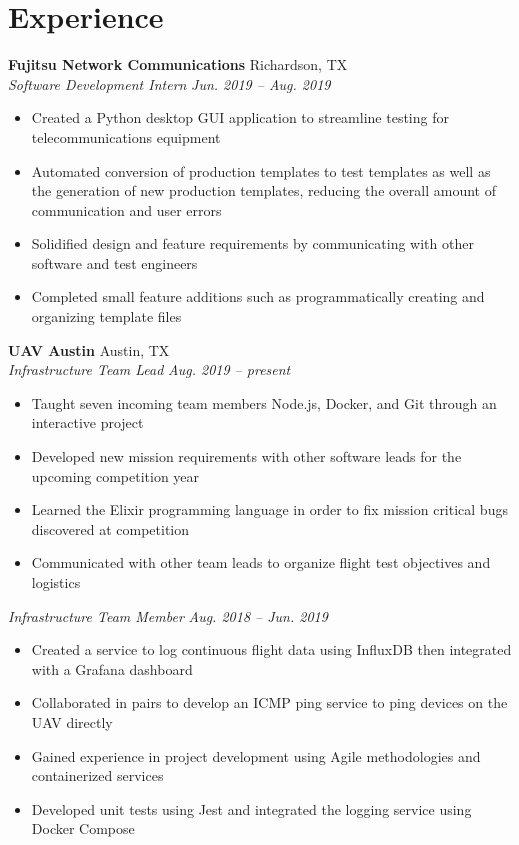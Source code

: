 \documentclass[letterpaper,11pt]{article}
\begin{document}
\section{Experience}
\textbf{Fujitsu Network Communications} \hfill Richardson, TX\\
\textit{Software Development Intern} \hfill \textit{Jun. 2019 -- Aug. 2019}\\
\begin{itemize}[noitemsep, topsep=0pt, leftmargin=0.7cm]
  \item Created a Python desktop GUI application to streamline testing for telecommunications equipment
  \item Automated conversion of production templates to test templates as well as the generation of new production templates, reducing the overall amount of communication and user errors
  \item Solidified design and feature requirements by communicating with other software and test engineers
  \item Completed small feature additions such as programmatically creating and organizing template files
\end{itemize}
\textbf{UAV Austin} \hfill Austin, TX\\
\textit{Infrastructure Team Lead} \hfill \textit{Aug. 2019 -- present}\\
\begin{itemize}[noitemsep, topsep=0pt, leftmargin=0.7cm]
  \item Taught seven incoming team members Node.js, Docker, and Git through an interactive project 
  \item Developed new mission requirements with other software leads for the upcoming competition year
  \item Learned the Elixir programming language in order to fix mission critical bugs discovered at competition
  \item Communicated with other team leads to organize flight test objectives and logistics
\end{itemize}
\textit{Infrastructure Team Member} \hfill \textit{Aug. 2018 -- Jun. 2019}\\
\begin{itemize}[noitemsep, topsep=0pt, leftmargin=0.7cm]
  \item Created a service to log continuous flight data using InfluxDB then integrated with a Grafana dashboard
  \item Collaborated in pairs to develop an ICMP ping service to ping devices on the UAV directly
  \item Gained experience in project development using Agile methodologies and containerized services 
  \item Developed unit tests using Jest and integrated the logging service using Docker Compose
\end{itemize}
\end{document}
